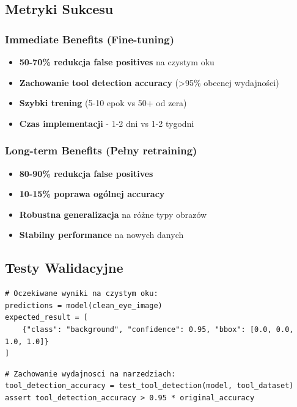 \documentclass[12pt,a4paper]{article}
\begin{document}
\subsection{Metryki Sukcesu}

\subsubsection{Immediate Benefits (Fine-tuning)}

\begin{itemize}
    \item \textbf{50-70\% redukcja false positives} na czystym oku
    \item \textbf{Zachowanie tool detection accuracy} (>95\% obecnej wydajności)
    \item \textbf{Szybki trening} (5-10 epok vs 50+ od zera)
    \item \textbf{Czas implementacji} - 1-2 dni vs 1-2 tygodni
\end{itemize}

\subsubsection{Long-term Benefits (Pełny retraining)}

\begin{itemize}
    \item \textbf{80-90\% redukcja false positives}
    \item \textbf{10-15\% poprawa ogólnej accuracy}
    \item \textbf{Robustna generalizacja} na różne typy obrazów
    \item \textbf{Stabilny performance} na nowych danych
\end{itemize}

\subsection{Testy Walidacyjne}

\begin{lstlisting}[caption={Test 1: Clean Eye Detection},label={lst:test1}]
# Oczekiwane wyniki na czystym oku:
predictions = model(clean_eye_image)
expected_result = [
    {"class": "background", "confidence": 0.95, "bbox": [0.0, 0.0, 1.0, 1.0]}
]
\end{lstlisting}

\begin{lstlisting}[caption={Test 2: Tool Detection Retention},label={lst:test2}]
# Zachowanie wydajnosci na narzedziach:
tool_detection_accuracy = test_tool_detection(model, tool_dataset)
assert tool_detection_accuracy > 0.95 * original_accuracy
\end{lstlisting}
\end{document}
